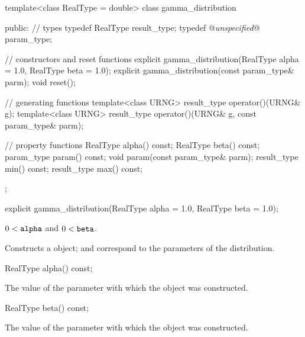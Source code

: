 \begin{codeblock}
template<class RealType = double>
 class gamma_distribution
{
public:
 // types
 typedef RealType result_type;
 typedef @\textit{unspecified}@ param_type;

 // constructors and reset functions
 explicit gamma_distribution(RealType alpha = 1.0, RealType beta = 1.0);
 explicit gamma_distribution(const param_type& parm);
 void reset();

 // generating functions
 template<class URNG>
   result_type operator()(URNG& g);
 template<class URNG>
   result_type operator()(URNG& g, const param_type& parm);

 // property functions
 RealType alpha() const;
 RealType beta() const;
 param_type param() const;
 void param(const param_type& parm);
 result_type min() const;
 result_type max() const;
};
\end{codeblock}


%
\begin{itemdecl}
explicit gamma_distribution(RealType alpha = 1.0, RealType beta = 1.0);
\end{itemdecl}

\begin{itemdescr}
\pnum\requires
 $ 0 < \texttt{alpha} $
 and $ 0 < \texttt{beta} $.

\pnum\effects Constructs a  object;
  and 
 correspond to the parameters of the distribution.
\end{itemdescr}

%
%
\begin{itemdecl}
RealType alpha() const;
\end{itemdecl}

\begin{itemdescr}
\pnum\returns The value of the  parameter
 with which the object was constructed.
\end{itemdescr}

%
%
\begin{itemdecl}
RealType beta() const;
\end{itemdecl}

\begin{itemdescr}
\pnum\returns The value of the  parameter
 with which the object was constructed.
\end{itemdescr}

